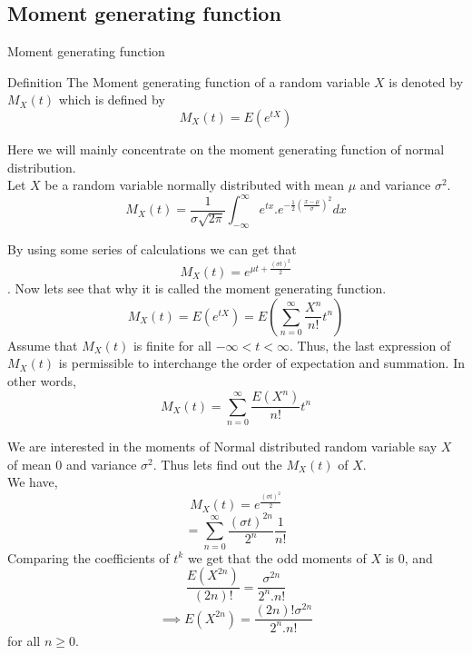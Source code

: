 \documentclass{beamer}
\numberwithin{theorem}{section}
\theoremstyle{definition}
\begin{document}
       \subsection{Moment generating function}
       \begin{frame}{Moment generating function}
           \begin{block}{Definition}
               The Moment generating function of a random variable $X$ is denoted by $M_X(t)$ which is defined by 
               $$M_X(t)=E(e^{tX})$$
           \end{block}
           Here we will mainly concentrate on the moment generating function of normal distribution.\\
           Let $X$ be a random variable normally distributed with mean $\mu$ and variance $\sigma^2$.
           $$M_X(t)=\frac{1}{\sigma\sqrt{2\pi}}\int_{-\infty}^{\infty}e^{tx}.e^{-\frac{1}{2}(\frac{x-\mu}{\sigma})^2}dx$$
           
       \end{frame}
       \begin{frame}{}
       By using some series of calculations we can get that $$M_X(t)=e^{\mu t+\frac{(\sigma t)^2}{2}}$$.
       Now lets see that why it is called the moment generating function.
       $$M_X(t)=E(e^{tX})=E\left(\sum_{n=0}^{\infty}\frac{X^n}{n!}t^n\right)$$
       Assume that $M_X(t)$ is finite for all $-\infty<t<\infty$. Thus, the last expression of $M_X(t)$ is permissible to interchange the order of expectation and summation. In other words,
       $$M_X(t)=\sum_{n=0}^{\infty}\frac{E(X^n)}{n!}t^n$$
           
       \end{frame}
       \begin{frame}{}
       We are interested in the moments of Normal distributed random variable say $X$ of mean $0$ and variance $\sigma^2$. Thus lets find out the $M_X(t)$ of $X$.\\
       We have,
       $$M_X(t)=e^{\frac{(\sigma t)^2}{2}}$$
       $$=\sum_{n=0}^{\infty}\frac{(\sigma t)^{2n}}{2^n}\frac{1}{n!}$$
       Comparing the coefficients of $t^k$ we get that the odd moments of $X$ is 0, and 
       $$\frac{E(X^{2n})}{(2n)!}=\frac{\sigma^{2n}}{2^n.n!}$$
       $$\implies E(X^{2n})=\frac{(2n)!\sigma^{2n}}{2^n.n!}$$
       for all $n\ge 0$.
           
       \end{frame}
\end{document}
